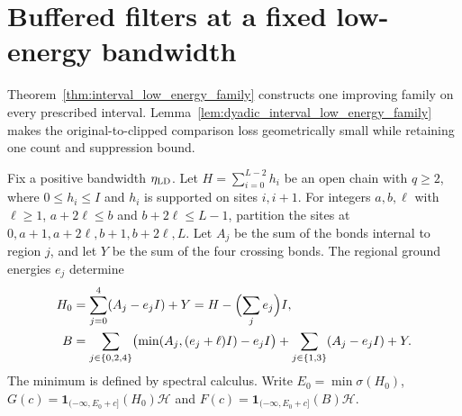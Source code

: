 \section{Buffered filters at a fixed low-energy bandwidth}

Theorem~\ref{thm:interval_low_energy_family} constructs one improving family
on every prescribed interval. Lemma~\ref{lem:dyadic_interval_low_energy_family}
makes the original-to-clipped comparison loss geometrically small while
retaining one count and suppression bound.

Fix a positive bandwidth $\eta_{\rm LD}$. Let $H=\sum_{i=0}^{L-2}h_i$ be
an open chain with $q\ge2$, where $0\le h_i\le I$ and $h_i$ is supported
on sites $i,i+1$. For integers $a,b,\ell$ with $\ell\ge1$,
$a+2\ell\le b$ and $b+2\ell\le L-1$, partition the sites at
$0,a+1,a+2\ell,b+1,b+2\ell,L$. Let $A_j$ be the sum of the bonds
internal to region $j$, and let $Y$ be the sum of the four crossing bonds.
The regional ground energies $e_j$ determine
\begin{align}
    H_0 & =\sum_{j=0}^4(A_j-e_jI)+Y=H-\Bigl(\sum_j e_j\Bigr)I,
    \notag                                                     \\
    B   & =\sum_{j\in\{0,2,4\}}
    \bigl(\min(A_j,(e_j+\ell)I)-e_jI\bigr)
    +\sum_{j\in\{1,3\}}(A_j-e_jI)+Y.
    \label{eq:ld_family_clipping}
\end{align}
The minimum is defined by spectral calculus. Write $E_0=\min\sigma(H_0)$,
$G(c)=\mathbf1_{(-\infty,E_0+c]}(H_0)\mathcal H$ and
$F(c)=\mathbf1_{(-\infty,E_0+c]}(B)\mathcal H$.

